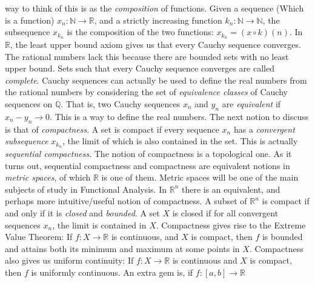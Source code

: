 \documentclass[crop=false,class=article,oneside]{standalone}
\begin{document}
            way to think of this is as the \textit{composition}
            of functions. Given a sequence (Which is a function)
            $x_{n}:\mathbb{N}\rightarrow\mathbb{R}$, and a
            strictly increasing function
            $k_{n}:\mathbb{N}\rightarrow\mathbb{N}$, the subsequence
            $x_{k_{n}}$ is the composition of the two functions:
            $x_{k_{n}}=(x\circ{k})(n)$.
            In $\mathbb{R}$, the least upper bound axiom gives
            us that every Cauchy sequence converges. The
            rational numbers lack this because there are
            bounded sets with no least upper bound. Sets such
            that every Cauchy sequence converges are called
            \textit{complete}. Cauchy sequences can actually be
            used to define the real numbers from the rational
            numbers by considering the set of
            \textit{equivalence classes} of Cauchy sequences on
            $\mathbb{Q}$. That is, two Cauchy sequences
            $x_{n}$ and $y_{n}$ are \textit{equivalent} if
            $x_{n}-y_{n}\rightarrow{0}$. This is a way to define
            the real numbers. The next notion to discuss is that
            of \textit{compactness}. A set is compact if every
            sequence $x_{n}$ has a \textit{convergent subsequence}
            $x_{k_{n}}$, the limit of which is also contained in
            the set. This is actually
            \textit{sequential compactness}. The notion of
            compactness is a topological one. As it turns out,
            sequential compactness and compactness are
            equivalent notions in \textit{metric spaces}, of
            which $\mathbb{R}$ is one of them. Metric spaces
            will be one of the main subjects of study in
            Functional Analysis. In $\mathbb{R}^{n}$ there is
            an equivalent, and perhaps more intuitive/useful
            notion of compactness. A subset of $\mathbb{R}^{n}$
            is compact if and only if it is
            \textit{closed} and \textit{bounded}. A set $X$ is
            closed if for all convergent sequences $x_{n}$,
            the limit is contained in $X$. Compactness gives rise
            to the Extreme Value Theorem: If $f:X\rightarrow\mathbb{R}$
            is continuous, and $X$ is compact, then $f$ is bounded
            and attains both its minimum and maximum at some points
            in $X$. Compactness also gives us uniform continuity:
            If $f:X\rightarrow\mathbb{R}$ is continuous and $X$
            is compact, then $f$ is uniformly continuous.
            An extra gem is, if $f:[a,b]\rightarrow\mathbb{R}$
\end{document}
